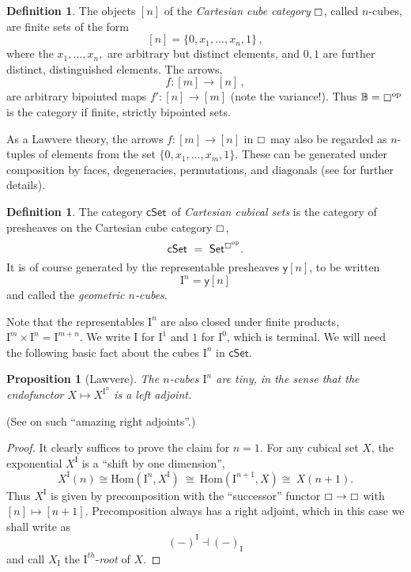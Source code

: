 \documentclass[11pt,reqno]{amsart}
\newcommand{\C}{\ensuremath{\boxempty}}
\newcommand{\B}{\ensuremath{\mathbb{B}}}
\newcommand{\psh}[1]{\ensuremath{\mathsf{Set}^{#1^{\mathrm{op}}}}}
\newcommand{\cSet}{\ensuremath{\mathsf{cSet}}}
\newcommand{\y}{\ensuremath{\mathsf{y}}} %
\newcommand{\op}[1]{\ensuremath{{#1}^{\mathrm{op}}}}
\newcommand{\ra}{\ensuremath{\rightarrow}}
\renewcommand{\to}{\ensuremath{\rightarrow}}
\renewcommand{\hom}{\ensuremath{\mathrm{Hom}}}
\newcommand{\I}{\ensuremath{\mathrm{I}}}
\newtheorem{proposition}[theorem]{Proposition}
\theoremstyle{remark}
\theoremstyle{definition}
\newtheorem{definition}[theorem]{Definition}
\begin{document}
\begin{definition}
The objects $[n]$ of the \emph{Cartesian cube category} $\C$, called $n$-cubes, are finite sets of the form 
\[
[n] = \{0, x_1, ..., x_n, 1\}\,,
\]
 where the $x_1, ..., x_n,$ are arbitrary but distinct elements, and $0,1$ are further distinct, distinguished elements.
The arrows,
\[
f : [m] \ra [n]\,,
\]
are arbitrary bipointed maps $f' : [n]\ra [m]$ (note the variance!).  Thus $\B = \op\C$ is the category if finite, strictly bipointed sets.  
\end{definition}
As a Lawvere theory, the arrows $f : [m] \ra [n]$ in $\C$ may also be regarded as $n$-tuples of elements from the set $\{0, x_1, ..., x_m, 1\}$.   These can be generated under composition by faces, degeneracies, permutations, and diagonals (see \cite{parker:thesis} for further details).

\begin{definition}\label{def:cSet}
The category \cSet\ of \emph{Cartesian cubical sets} is the category of presheaves on the Cartesian cube category $\C$,
\[
\mathsf{cSet}\ =\ \psh{\C}.
\]
It is of course generated by the representable presheaves $\y{[n]}$, to be written \[
\I^n = \y{[n]}
\]
 and called the \emph{geometric $n$-cubes}.   
\end{definition}

Note that the representables $\I^n$ are also closed under finite products, $\I^m \times \I^n = \I^{m+n}$.  We write $\I$ for $\I^1$ and $1$ for $\I^0$, which is terminal.  We will need the following basic fact about the cubes $\I^n$ in $\cSet$.

\begin{proposition}[Lawvere]\label{prop:Itiny}
The $n$-cubes $\I^n$ are \emph{tiny}, in the sense that the endofunctor $X\mapsto X^{\I^n}$ is a left adjoint.
\end{proposition}
\noindent (See \cite{Lawvere:2004} on such ``amazing right adjoints''.)

\begin{proof}
It clearly suffices to prove the claim for $n=1$.   For any cubical set $X$, the exponential $X^\I$ is a ``shift by one dimension'', 
\[
X^\I(n) \cong \hom(\I^n, X^\I)\ \cong\  \hom(\I^{n+1}, X)\cong\ X(n+1).
\]
Thus $X^\I$ is given by precomposition with the ``successor'' functor $\C\to\C$ with $[n] \mapsto [n+1]$. Precomposition always has a right adjoint, which in this case we shall write as 
\[
(-)^\I\dashv (-)_\I 
\]
 and call $X_\I$ the $\I^{th}$-\emph{root} of $X$.
\end{proof}
\end{document}
